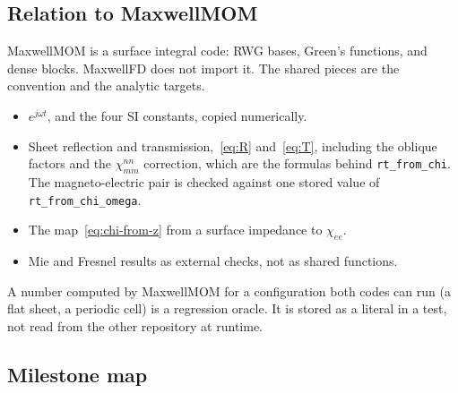 \documentclass[11pt,a4paper]{article}
\numberwithin{equation}{section}
\begin{document}
\subsection{Relation to MaxwellMOM}
\label{sec:mom}

MaxwellMOM is a surface integral code: RWG bases, Green's functions, and dense
blocks. MaxwellFD does not import it. The shared pieces are the convention and
the analytic targets.

\begin{itemize}
\item $e^{j\omega t}$, and the four SI constants, copied numerically.
\item Sheet reflection and transmission,~\eqref{eq:R} and~\eqref{eq:T},
including the oblique factors and the $\chi_{mm}^{nn}$ correction, which are
the formulas behind \texttt{rt\_from\_chi}. The magneto-electric pair is
checked against one stored value of \texttt{rt\_from\_chi\_omega}.
\item The map~\eqref{eq:chi-from-z} from a surface impedance to $\chi_{ee}$.
\item Mie and Fresnel results as external checks, not as shared functions.
\end{itemize}

A number computed by MaxwellMOM for a configuration both codes can run (a flat
sheet, a periodic cell) is a regression oracle. It is stored as a literal in a
test, not read from the other repository at runtime.

\subsection{Milestone map}
\label{sec:milestones}
\end{document}
